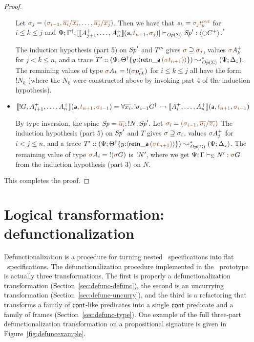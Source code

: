 \begin{proof}
\begin{itemize}
   \smallskip
    
   Let
   $\lf{\sigma_j} = \lf{(\sigma_{i-1},
                   \overline{u_i}/\overline{x_i},\ldots,
                   \overline{u_j}/\overline{x_j})}$.
   Then we have that $\lf{s_k} = \lf{{\sigma_j}t^{\it out}_k}$ 
   for $i \leq k \leq j$ and
   $\slst{\transop{\Sigma}}{\Psi}{\opsubst{\Gamma},[\opbasic{A^+_{j+1},\ldots,A^+_n}{t_{n+1}}{\sigma_{j}}]}{\Sp'}{\susp{{\ocircle}C^+}}$.$^*$

  \smallskip

 The induction 
   hypothesis (part 5) on ${\it Sp}'$ and $T'''$
  gives $\lf{\sigma} \supseteq \lf{\sigma_{j}}$, values
  $\lf{\sigma}{A^+_{k}}$ for $j < k \leq n$, and 
  a trace $T' :: (\Psi; \tackon{\opsubst{\Theta}}{y{:}\susp{{\sf retn\_a}\,\lf{(\sigma t_{n+1})}}})
  \leadsto^*_{\transop{\Sigma}}
 (\Psi; \Delta_z)$. The remaining values of type
   $\lf{\sigma}A_k = {!}(\lf{\sigma}p^-_{ck})$ for $i \leq k \leq j$
   all have the form ${!}N_k$ (where the $N_k$ were constructed above by
   invoking part 4 of the induction hypothesis).
   \bigskip


\item $\opbasic{{!}G,A^+_{i+1},\ldots,A^+_n}{t_{n+1}}{\sigma_{i-1}} = \forall
  \overline{x_i}.\, {!}\sigma_{i-1}\opsubst{G} \lefti
  \opbasic{A^+_i,\ldots,A^+_n}{t_{n+1}}{\sigma_{i-1}}$

  \bigskip
  By type inversion, the spine $\Sp = \lf{\overline{u_i}}; {!}N; \Sp'$. 
  Let $\lf{\sigma_i} = \lf{(\sigma_{i-1}, \overline{u_i}/\overline{x_i})}$
  The induction hypothesis (part 5) on ${\it Sp}'$ and $T$
  gives $\lf{\sigma} \supseteq \lf{\sigma_{i}}$, values
  $\lf{\sigma}{A^+_{j}}$ for $i < j \leq n$, and 
  a trace $T' :: (\Psi; \tackon{\opsubst{\Theta}}{y{:}\susp{{\sf retn\_a}\,\lf{(\sigma t_{n+1})}}})
  \leadsto^*_{\transop{\Sigma}}
 (\Psi; \Delta_z)$. The remaining value of type 
  $\lf\sigma A_i = {!}(\lf{\sigma}G)$
  is ${!}{N'}$, where we get $\slst{\Sigma}{\Psi}{\Gamma}{N'}{\lf{\sigma}{G}}$ from the induction hypothesis (part 3) on $N$.
\end{itemize}
\smallskip

\noindent
This completes the proof.
\end{proof}


\section{Logical transformation: defunctionalization}
\label{sec:defunctionalization}

Defunctionalization is a procedure for turning nested
\sls~specifications into flat \sls~specifications. The
defunctionalization procedure implemented in the \sls~prototype is
actually three transformations. The first is properly a
defunctionalization transformation (Section~\ref{sec:defunc-defunc}),
the second is an uncurrying transformation
(Section~\ref{sec:defunc-uncurry}), and the third is a refactoring
that transforms a family of ${\sf cont}$-like predicates into a single
${\sf cont}$ predicate and a family of frames
(Section~\ref{sec:defunc-type}). One example of the full three-part
defunctionalization transformation on a propositional signature is given 
in Figure~\ref{fig:defuncexample}.

